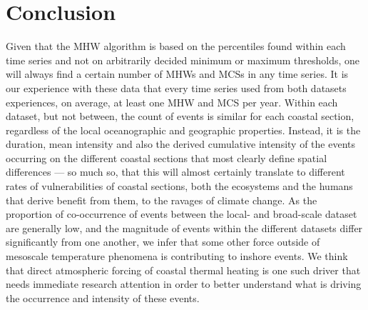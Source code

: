 \documentclass[a4paper,10pt,review]{elsarticle}
\begin{document}
\section{Conclusion}
Given that the MHW algorithm is based on the percentiles found within each time series and not on arbitrarily decided minimum or maximum thresholds, one will always find a certain number of MHWs and MCSs in any time series. It is our experience with these data that every time series used from both datasets experiences, on average, at least one MHW and MCS per year. Within each dataset, but not between, the count of events is similar for each coastal section, regardless of the local oceanographic and geographic properties. Instead, it is the duration, mean intensity and also the derived cumulative intensity of the events occurring on the different coastal sections that most clearly define spatial differences --- so much so, that this will almost certainly translate to different rates of vulnerabilities of coastal sections, both the ecosystems and the humans that derive benefit from them, to the ravages of climate change. As the proportion of co-occurrence of events between the local- and broad-scale dataset are generally low, and the magnitude of events within the different datasets differ significantly from one another, we infer that some other force outside of mesoscale temperature phenomena is contributing to inshore events. We think that direct atmospheric forcing of coastal thermal heating is one such driver that needs immediate research attention in order to better understand what is driving the occurrence and intensity of these events.
\end{document}
